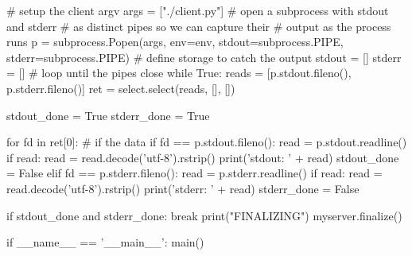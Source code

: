 \begin{codepar}
    # setup the client argv
    args = ["./client.py"]
    # open a subprocess with stdout and stderr
    # as distinct pipes so we can capture their
    # output as the process runs
    p = subprocess.Popen(args, env=env,
        stdout=subprocess.PIPE, stderr=subprocess.PIPE)
    # define storage to catch the output
    stdout = []
    stderr = []
    # loop until the pipes close
    while True:
        reads = [p.stdout.fileno(), p.stderr.fileno()]
        ret = select.select(reads, [], [])

        stdout_done = True
        stderr_done = True

        for fd in ret[0]:
            # if the data
            if fd == p.stdout.fileno():
                read = p.stdout.readline()
                if read:
                    read = read.decode('utf-8').rstrip()
                    print('stdout: ' + read)
                    stdout_done = False
            elif fd == p.stderr.fileno():
                read = p.stderr.readline()
                if read:
                    read = read.decode('utf-8').rstrip()
                    print('stderr: ' + read)
                    stderr_done = False

        if stdout_done and stderr_done:
            break
    print("FINALIZING")
    myserver.finalize()


if __name__ == '__main__':
    main()
\end{codepar}
\pyspecificend

